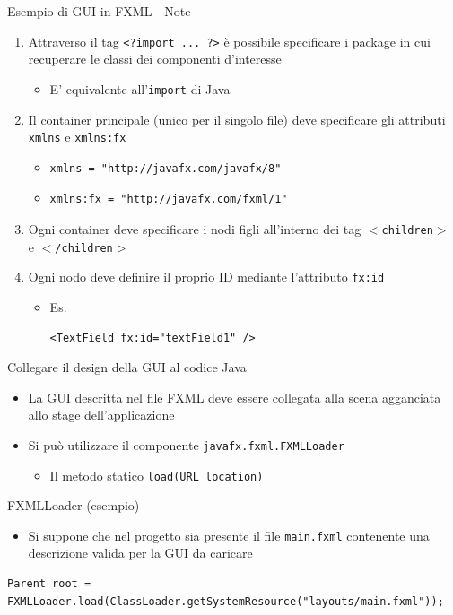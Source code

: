\documentclass[presentation]{beamer}
\begin{document}
\begin{frame}[fragile]{Esempio di GUI in FXML - Note}
\begin{enumerate}\itemsep15pt
\item Attraverso il tag \texttt{<?import ... ?>} è possibile specificare i package in cui recuperare le classi dei componenti d'interesse
\begin{itemize}
\item E' equivalente all'\texttt{import} di Java
\end{itemize}
\item Il container principale (unico per il singolo file) \underline{deve} specificare gli attributi \texttt{xmlns} e \texttt{xmlns:fx}
\begin{itemize}
\item \begin{verbatim}xmlns = "http://javafx.com/javafx/8"\end{verbatim}
\item \begin{verbatim}xmlns:fx = "http://javafx.com/fxml/1"\end{verbatim}
\end{itemize}
\item Ogni container deve specificare i nodi figli all'interno dei tag \texttt{$<$children$>$} e \texttt{$<$/children$>$}
\item Ogni nodo deve definire il proprio ID mediante l'attributo \texttt{fx:id}
\begin{itemize}
\item Es. \begin{verbatim}<TextField fx:id="textField1" />\end{verbatim}
\end{itemize}
\end{enumerate}
\end{frame}

\begin{frame}[fragile]{Collegare il design della GUI al codice Java}
\begin{itemize}\itemsep10pt
\item La GUI descritta nel file FXML deve essere collegata alla scena agganciata allo stage dell'applicazione
\item Si può utilizzare il componente \texttt{javafx.fxml.FXMLLoader}
\begin{itemize}
\item Il metodo statico \texttt{load(URL location)} 
\end{itemize}
\end{itemize}
\begin{block}{FXMLLoader (esempio)}
\begin{itemize}
\item Si suppone che nel progetto sia presente il file \texttt{main.fxml} contenente una descrizione valida per la GUI da caricare
\end{itemize}
\begin{lstlisting}
Parent root = FXMLLoader.load(ClassLoader.getSystemResource("layouts/main.fxml"));
\end{lstlisting}
\end{block}
\end{frame}
\end{document}
